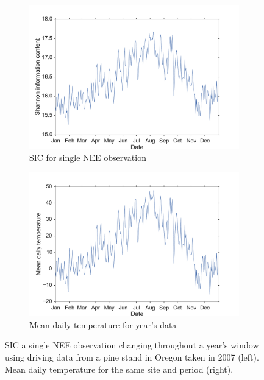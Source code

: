 \begin{figure}[ht]
    \centering
    \begin{subfigure}[b]{0.45\textwidth}
        \includegraphics[width=\textwidth]{chapter/chapter5/oregon2007SICneeD2.pdf}
        \caption{SIC for single NEE observation}
        \label{chap5:fig:sic_nee_oregon2007_D2}
    \end{subfigure}%
    \begin{subfigure}[b]{0.45\textwidth}
        \includegraphics[width=\textwidth]{chapter/chapter5/oregon2007temp.pdf}
        \caption{Mean daily temperature for year's data}
        \label{chap5:fig:temp_nee_oregon2007_D2}
    \end{subfigure}
    \caption{SIC a single NEE observation changing throughout a year's window using driving data from a pine stand in Oregon taken in 2007 (left). Mean daily temperature for the same site and period (right).}
    \label{chap5:fig:neeSIC_temp_comp_D2}
\end{figure}

